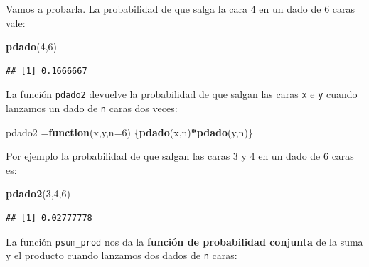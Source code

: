 \documentclass[]{book}
\newenvironment{Shaded}{\begin{snugshade}}{\end{snugshade}}
\newcommand{\ControlFlowTok}[1]{\textcolor[rgb]{0.13,0.29,0.53}{\textbf{#1}}}
\newcommand{\DataTypeTok}[1]{\textcolor[rgb]{0.13,0.29,0.53}{#1}}
\newcommand{\DecValTok}[1]{\textcolor[rgb]{0.00,0.00,0.81}{#1}}
\newcommand{\KeywordTok}[1]{\textcolor[rgb]{0.13,0.29,0.53}{\textbf{#1}}}
\newcommand{\NormalTok}[1]{#1}
\newcommand{\OperatorTok}[1]{\textcolor[rgb]{0.81,0.36,0.00}{\textbf{#1}}}
\begin{document}
Vamos a probarla. La probabilidad de que salga la cara 4 en un dado de 6 caras vale:

\begin{Shaded}
\begin{Highlighting}[]
\KeywordTok{pdado}\NormalTok{(}\DecValTok{4}\NormalTok{,}\DecValTok{6}\NormalTok{)}
\end{Highlighting}
\end{Shaded}

\begin{verbatim}
## [1] 0.1666667
\end{verbatim}

La función \texttt{pdado2} devuelve la probabilidad de que salgan las caras \texttt{x} e \texttt{y} cuando lanzamos un dado de \texttt{n} caras dos veces:

\begin{Shaded}
\begin{Highlighting}[]
\NormalTok{pdado2 =}\ControlFlowTok{function}\NormalTok{(x,y,}\DataTypeTok{n=}\DecValTok{6}\NormalTok{) \{}\KeywordTok{pdado}\NormalTok{(x,n)}\OperatorTok{*}\KeywordTok{pdado}\NormalTok{(y,n)\}}
\end{Highlighting}
\end{Shaded}

Por ejemplo la probabilidad de que salgan las caras 3 y 4 en un dado de 6 caras es:

\begin{Shaded}
\begin{Highlighting}[]
\KeywordTok{pdado2}\NormalTok{(}\DecValTok{3}\NormalTok{,}\DecValTok{4}\NormalTok{,}\DecValTok{6}\NormalTok{)}
\end{Highlighting}
\end{Shaded}

\begin{verbatim}
## [1] 0.02777778
\end{verbatim}

La función \texttt{psum\_prod} nos da la \textbf{función de probabilidad conjunta} de la suma y el producto cuando lanzamos dos dados de \texttt{n} caras:
\end{document}
